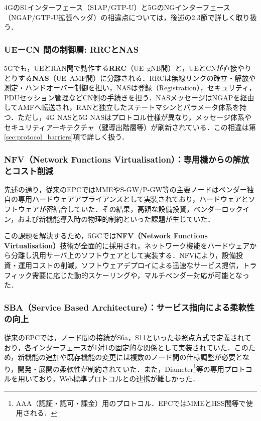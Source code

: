 4GのS1インターフェース（S1AP/GTP-U）と5GのNGインターフェース（NGAP/GTP-U拡張ヘッダ）の相違点については，後述の2.3節で詳しく取り扱う．

\subsubsection{UEーCN 間の制御層: RRCとNAS}
5Gでも，UEとRAN間で動作する\textbf{RRC}（UE–gNB間）\cite{3GPP_TS38331}と，UEとCNが直接やりとりする\textbf{NAS}（UE–AMF間）に分離される．RRCは無線リンクの確立・解放や測定・ハンドオーバー制御を担い，NASは登録（Registration），セキュリティ，PDUセッション管理などCN側の手続きを担う\cite{3GPP_TS24501}．NASメッセージはNGAPを経由してAMFへ転送され，RANと独立したステートマシンとパラメータ体系を持つ．ただし，4G NASと5G NASはプロトコル仕様が異なり，メッセージ体系やセキュリティアーキテクチャ（鍵導出階層等）が刷新されている．この相違は第\ref{sec:protocol_barriers}項で詳しく扱う．
\subsubsection{NFV（Network Functions Virtualisation）：専用機からの解放とコスト削減}
先述の通り，従来のEPCではMMEやS-GW/P-GW等の主要ノードはベンダー独自の専用ハードウェアアプライアンスとして実装されており，ハードウェアとソフトウェアが密結合していた\cite{etsi_nfv_2012}．その結果，高額な設備投資，ベンダーロックイン，および新機能導入時の物理的制約といった課題が生じていた．

この課題を解決するため，5GCでは\textbf{NFV（Network Functions Virtualisation）}技術が全面的に採用され，ネットワーク機能をハードウェアから分離し汎用サーバ上のソフトウェアとして実装する\cite{etsi_nfv_2012}．NFVにより，設備投資・運用コストの削減，ソフトウェアデプロイによる迅速なサービス提供，トラフィック需要に応じた動的スケーリングや，マルチベンダー対応が可能となった．
\subsubsection{SBA（Service Based Architecture）：サービス指向による柔軟性の向上}
従来のEPCでは，ノード間の接続がS6a，S11といった参照点方式で定義されており，各インターフェースが1対1の固定的な関係として実装されていた\cite{3GPP_TS23401}．このため，新機能の追加や既存機能の変更には複数のノード間の仕様調整が必要となり，開発・展開の柔軟性が制約されていた．また，Diameter\footnote{AAA（認証・認可・課金）用のプロトコル．EPCではMMEとHSS間等で使用される．}等の専用プロトコルを用いており，Web標準プロトコルとの連携が難しかった．

